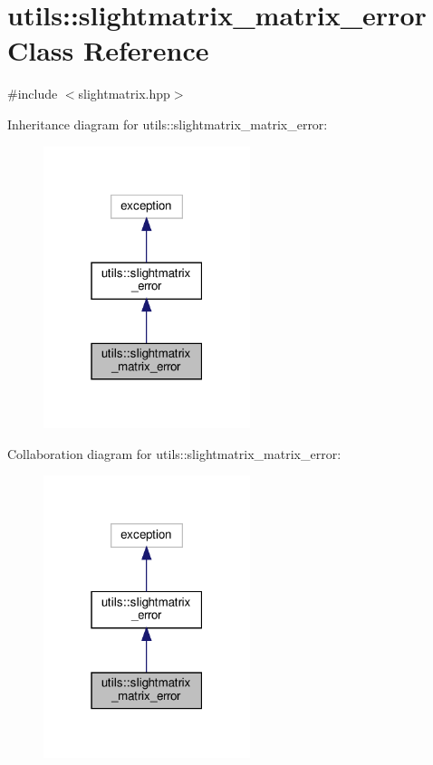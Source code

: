 \hypertarget{classutils_1_1slightmatrix__matrix__error}{}\section{utils\+:\+:slightmatrix\+\_\+matrix\+\_\+error Class Reference}
\label{classutils_1_1slightmatrix__matrix__error}


{\ttfamily \#include $<$slightmatrix.\+hpp$>$}



Inheritance diagram for utils\+:\+:slightmatrix\+\_\+matrix\+\_\+error\+:
\nopagebreak
\begin{figure}[H]
\begin{center}
\leavevmode
\includegraphics[width=171pt]{classutils_1_1slightmatrix__matrix__error__inherit__graph}
\end{center}
\end{figure}


Collaboration diagram for utils\+:\+:slightmatrix\+\_\+matrix\+\_\+error\+:
\nopagebreak
\begin{figure}[H]
\begin{center}
\leavevmode
\includegraphics[width=171pt]{classutils_1_1slightmatrix__matrix__error__coll__graph}
\end{center}
\end{figure}


